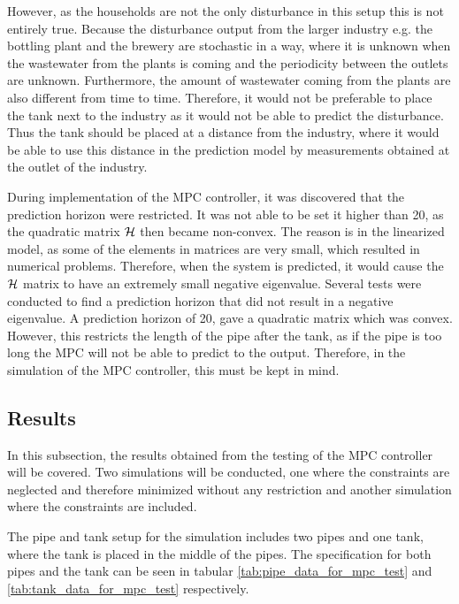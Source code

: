 However, as the households are not the only disturbance in this setup this is not entirely true. Because the disturbance output from the larger industry e.g. the bottling plant and the brewery are stochastic in a way, where it is unknown when the wastewater from the plants is coming and the periodicity between the outlets are unknown. Furthermore, the amount of wastewater coming from the plants are also different from time to time. Therefore, it would not be preferable to place the tank next to the industry as it would not be able to predict the disturbance. 
Thus the tank should be placed at a distance from the industry, where it would be able to use this distance in the prediction model by measurements obtained at the outlet of the industry.%

During implementation of the MPC controller, it was discovered that the prediction horizon were restricted. It was not able to be set it higher than 20, as the quadratic matrix $\CMcal{H}$ then became non-convex. The reason is in the linearized model, as some of the elements in matrices are very small, which resulted in numerical problems. Therefore, when the system is predicted, it would cause the $\CMcal{H}$ matrix to have an extremely small negative eigenvalue. Several tests were conducted to find a prediction horizon that did not result in a negative eigenvalue. A prediction horizon of 20, gave a quadratic matrix which was convex. However, this restricts the length of the pipe after the tank, as if the pipe is too long the MPC will not be able to predict to the output. Therefore, in the simulation of the MPC controller, this must be kept in mind.   

\subsection*{Results}
In this subsection, the results obtained from the testing of the MPC controller will be covered. Two simulations will be conducted, one where the constraints are neglected and therefore minimized without any restriction and another simulation where the constraints are included. 

The pipe and tank setup for the simulation includes two pipes and one tank, where the tank is placed in the middle of the pipes. The specification for both pipes and the tank can be seen in tabular \ref{tab:pipe_data_for_mpc_test} and \ref{tab:tank_data_for_mpc_test} respectively.

